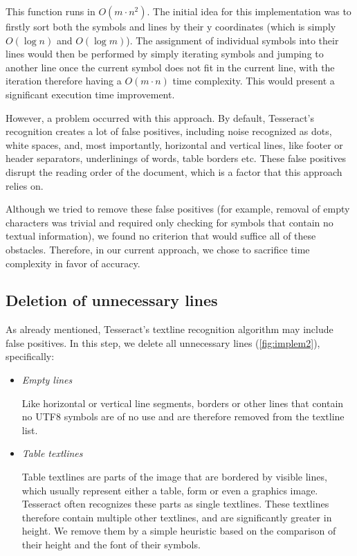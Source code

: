 This function runs in $O(m\cdot n^2)$. The initial idea for this implementation was to firstly sort both the symbols and lines by their y coordinates (which is simply $O(\log n)$ and $O(\log m)$). The assignment of individual symbols into their lines would then be performed by simply iterating symbols and jumping to another line once the current symbol does not fit in the current line, with the iteration therefore having a $O(m\cdot n)$ time complexity. This would present a significant execution time improvement.

However, a problem occurred with this approach. By default, Tesseract's recognition creates a lot of false positives, including noise recognized as dots, white spaces, and, most importantly, horizontal and vertical lines, like footer or header separators, underlinings of words, table borders etc. These false positives disrupt the reading order of the document, which is a factor that this approach relies on.

Although we tried to remove these false positives (for example, removal of empty characters was trivial and required only checking for symbols that contain no textual information), we found no criterion that would suffice all of these obstacles. Therefore, in our current approach, we chose to sacrifice time complexity in favor of accuracy.

\subsection{Deletion of unnecessary lines}

As already mentioned, Tesseract's textline recognition algorithm may include false positives. In this step, we delete all unnecessary lines (\cref{fig:implem2}), specifically:

\begin{itemize}
\item \emph{Empty lines}

Like horizontal or vertical line segments, borders or other lines that contain no UTF8 symbols are of no use and are therefore removed from the textline list.

\item \emph{Table textlines}

Table textlines are parts of the image that are bordered by visible lines, which usually represent either a table, form or even a graphics image. Tesseract often recognizes these parts as single textlines. These textlines therefore contain multiple other textlines, and are significantly greater in height. We remove them by a simple heuristic based on the comparison of their height and the font of their symbols.
\end{itemize}

